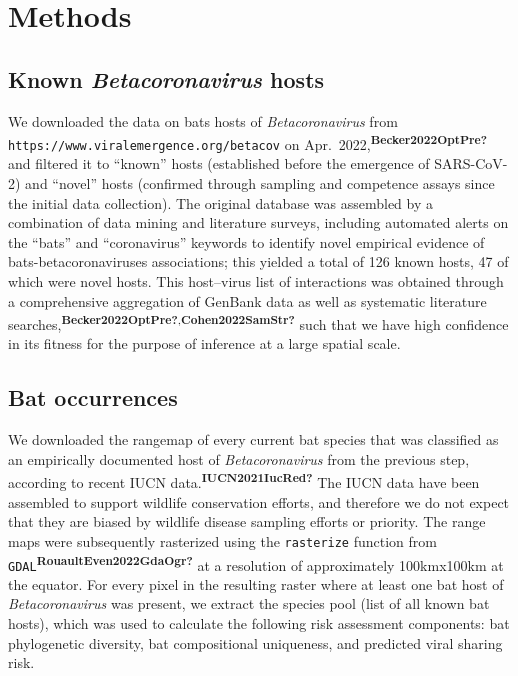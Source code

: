 \documentclass[10pt,oneside]{article}
\begin{document}
\newpage

\hypertarget{methods}{%
\section{Methods}\label{methods}}

\hypertarget{known-betacoronavirus-hosts}{%
\subsection{\texorpdfstring{Known \emph{Betacoronavirus}
hosts}{Known Betacoronavirus hosts}}\label{known-betacoronavirus-hosts}}

We downloaded the data on bats hosts of \emph{Betacoronavirus} from
\texttt{https://www.viralemergence.org/betacov} on
Apr.~2022,\textsuperscript{\textbf{Becker2022OptPre?}} and filtered it
to ``known'' hosts (established before the emergence of SARS-CoV-2) and
``novel'' hosts (confirmed through sampling and competence assays since
the initial data collection). The original database was assembled by a
combination of data mining and literature surveys, including automated
alerts on the ``bats'' and ``coronavirus'' keywords to identify novel
empirical evidence of bats-betacoronaviruses associations; this yielded
a total of 126 known hosts, 47 of which were novel hosts. This
host--virus list of interactions was obtained through a comprehensive
aggregation of GenBank data as well as systematic literature
searches,\textsuperscript{\textbf{Becker2022OptPre?},\textbf{Cohen2022SamStr?}}
such that we have high confidence in its fitness for the purpose of
inference at a large spatial scale.

\hypertarget{bat-occurrences}{%
\subsection{Bat occurrences}\label{bat-occurrences}}

We downloaded the rangemap of every current bat species that was
classified as an empirically documented host of \emph{Betacoronavirus}
from the previous step, according to recent IUCN
data.\textsuperscript{\textbf{IUCN2021IucRed?}} The IUCN data have been
assembled to support wildlife conservation efforts, and therefore we do
not expect that they are biased by wildlife disease sampling efforts or
priority. The range maps were subsequently rasterized using the
\texttt{rasterize} function from
\texttt{GDAL}\textsuperscript{\textbf{RouaultEven2022GdaOgr?}} at a
resolution of approximately 100kmx100km at the equator. For every pixel
in the resulting raster where at least one bat host of
\emph{Betacoronavirus} was present, we extract the species pool (list of
all known bat hosts), which was used to calculate the following risk
assessment components: bat phylogenetic diversity, bat compositional
uniqueness, and predicted viral sharing risk.
\end{document}
